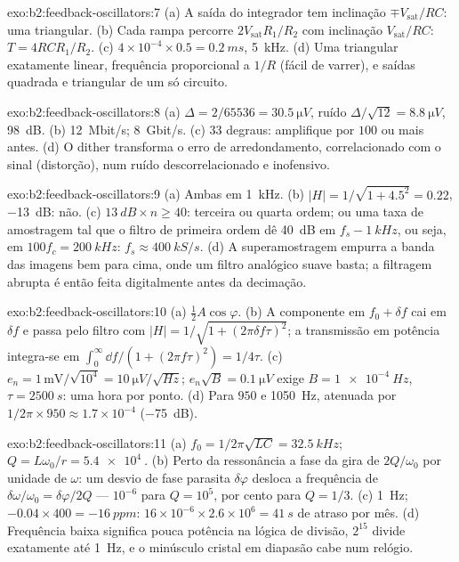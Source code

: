 \begin{solution}{exo:b2:feedback-oscillators:7}
(a) A saída do integrador tem inclinação $\mp V_{\text{sat}}/RC$: uma triangular. (b)
Cada rampa percorre $2V_{\text{sat}}R_1/R_2$ com inclinação $V_{\text{sat}}/RC$: $T = 4RCR_1/R_2$.
(c) $4 \times 10^{-4} \times 0.5 = \qty{0.2}{ms}$, \qty{5}{kHz}. (d) Uma triangular
exatamente linear, frequência proporcional a $1/R$ (fácil de varrer), e saídas quadrada e
triangular de um só circuito.
\end{solution}

\begin{solution}{exo:b2:feedback-oscillators:8}
(a) $\Delta = 2/65536 = \qty{30.5}{\micro V}$, ruído $\Delta/\sqrt{12} = \qty{8.8}{\micro V}$,
\qty{98}{dB}. (b) \qty{12}{Mbit/s}; \qty{8}{Gbit/s}. (c) $33$ degraus: amplifique por
$100$ ou mais antes. (d) O dither transforma o erro de arredondamento, correlacionado
com o sinal (distorção), num ruído descorrelacionado e inofensivo.
\end{solution}

\begin{solution}{exo:b2:feedback-oscillators:9}
(a) Ambas em \qty{1}{kHz}. (b) $|H| = 1/\sqrt{1 + 4.5^2} = 0.22$, \qty{-13}{dB}: não. (c)
$\qty{13}{dB} \times n \ge 40$: terceira ou quarta ordem; ou uma taxa de amostragem tal
que o filtro de primeira ordem dê \qty{40}{dB} em $f_s - \qty{1}{kHz}$, ou seja, em
$100f_c = \qty{200}{kHz}$: $f_s \approx \qty{400}{kS/s}$. (d) A superamostragem empurra a
banda das imagens bem para cima, onde um filtro analógico suave basta; a filtragem
abrupta é então feita digitalmente antes da decimação.
\end{solution}

\begin{solution}{exo:b2:feedback-oscillators:10}
(a) $\tfrac12A\cos\varphi$. (b) A componente em $f_0 + \delta f$ cai em $\delta f$
e passa pelo filtro com $|H| = 1/\sqrt{1 + (2\pi\delta f\tau)^2}$; a transmissão
em potência integra-se em $\int_0^\infty\dd f/(1 + (2\pi f\tau)^2) = 1/4\tau$.
(c) $e_n = 1\,\text{mV}/\sqrt{10^4} = \qty{10}{\micro V/\sqrt{Hz}}$; $e_n\sqrt B = \qty{0.1}{\micro V}$
exige $B = \qty{1e-4}{Hz}$, $\tau = \qty{2500}{s}$: uma hora por ponto. (d) Para $950$
e \qty{1050}{Hz}, atenuada por $1/2\pi \times 950 \approx 1.7 \times 10^{-4}$ (\qty{-75}{dB}).
\end{solution}

\begin{solution}{exo:b2:feedback-oscillators:11}
(a) $f_0 = 1/2\pi\sqrt{LC} = \qty{32.5}{kHz}$; $Q = L\omega_0/r = \qty{5.4e4}{}$. (b) Perto da
ressonância a fase da  gira de $2Q/\omega_0$ por unidade de $\omega$: um
desvio de fase parasita $\delta\varphi$ desloca a frequência de $\delta\omega/\omega_0 =
\delta\varphi/2Q$ --- $10^{-6}$ para $Q = 10^5$, por cento para $Q = 1/3$. (c) \qty{1}{Hz};
$-0.04 \times 400 = \qty{-16}{ppm}$: $16 \times 10^{-6} \times 2.6 \times 10^6 = \qty{41}{s}$ de atraso por
mês. (d) Frequência baixa significa pouca potência na lógica de divisão, $2^{15}$
divide exatamente até \qty{1}{Hz}, e o minúsculo cristal em diapasão cabe num
relógio.
\end{solution}

